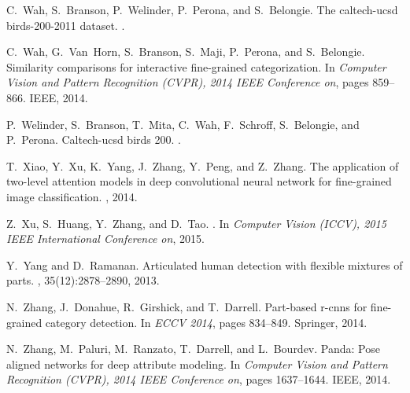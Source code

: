 \documentclass[10pt,twocolumn,letterpaper]{article}
\begin{document}
\begin{thebibliography}{10}
C.~Wah, S.~Branson, P.~Welinder, P.~Perona, and S.~Belongie.
\newblock The caltech-ucsd birds-200-2011 dataset.
.

C.~Wah, G.~Van~Horn, S.~Branson, S.~Maji, P.~Perona, and S.~Belongie.
\newblock Similarity comparisons for interactive fine-grained categorization.
\newblock In {\em Computer Vision and Pattern Recognition (CVPR), 2014 IEEE
  Conference on}, pages 859--866. IEEE, 2014.

P.~Welinder, S.~Branson, T.~Mita, C.~Wah, F.~Schroff, S.~Belongie, and
  P.~Perona.
\newblock Caltech-ucsd birds 200.
.

T.~Xiao, Y.~Xu, K.~Yang, J.~Zhang, Y.~Peng, and Z.~Zhang.
\newblock The application of two-level attention models in deep convolutional
  neural network for fine-grained image classification.
, 2014.

Z.~Xu, S.~Huang, Y.~Zhang, and D.~Tao.
.
\newblock In {\em Computer Vision (ICCV), 2015 IEEE International Conference
  on}, 2015.

Y.~Yang and D.~Ramanan.
\newblock Articulated human detection with flexible mixtures of parts.
, 35(12):2878--2890, 2013.

N.~Zhang, J.~Donahue, R.~Girshick, and T.~Darrell.
\newblock Part-based r-cnns for fine-grained category detection.
\newblock In {\em ECCV 2014}, pages 834--849. Springer, 2014.

N.~Zhang, M.~Paluri, M.~Ranzato, T.~Darrell, and L.~Bourdev.
\newblock Panda: Pose aligned networks for deep attribute modeling.
\newblock In {\em Computer Vision and Pattern Recognition (CVPR), 2014 IEEE
  Conference on}, pages 1637--1644. IEEE, 2014.

\end{thebibliography}
 
{\small


}
\end{document}
